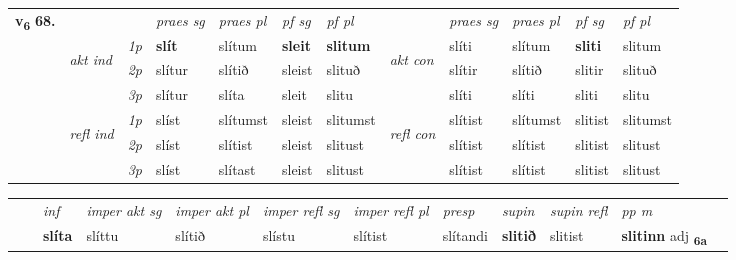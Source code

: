 \begin{tabular}{llllllllllll} \toprule
\multirow{4}{*}{{{\textbf{v{\textsubscript{6}}} \Large{\textbf{68.}}}}}  & &   &  \textit{praes sg}  & \textit{praes pl}  &\textit{ pf sg} & \textit{pf pl} &  &  \textit{praes sg}  & \textit{praes pl}  & \textit{pf sg} & \textit{pf pl } \\*
	\cmidrule{4-7} \cmidrule{9-12}
 & \multirow{3}{*}{\begin{turn}{90}\textit{akt ind}\end{turn}} & {\textit{1p}} & \textbf{slít} & slítum    & \textbf{sleit} & \textbf{slitum} & \multirow{3}{*}{\begin{turn}{90}\textit{akt con}\end{turn}} &slíti & slítum & \textbf{sliti} & slitum\\*
& &  {\textit{2p}} &  slítur  & slítið   & sleist & slituð & & slítir & slítið & slitir & slituð \\*
& &  {\textit{3p}} & slítur & slíta   & sleit & slitu & & slíti & slíti& sliti & slitu  \\*
\cmidrule{4-7} \cmidrule{9-12}
 &\multirow{3}{*}{\begin{turn}{90}\textit{refl ind}\end{turn}} & {\textit{1p}} & slíst & slítumst    & sleist & slitumst & \multirow{3}{*}{\begin{turn}{90}\textit{refl con}\end{turn}}  &slítist & slítumst & slitist & slitumst\\*
 &&  {\textit{2p}} &  slíst  & slítist   & sleist & slitust & &slítist & slítist & slitist & slitust \\*
& &  {\textit{3p}} & slíst & slítast   & sleist & slitust & & slítist & slítist& slitist & slitust  \\*
\cmidrule{4-7} \cmidrule{9-12}
\end{tabular}


\begin{tabular}{llllllllllll}
 & & \textit{inf} & \textit{imper akt sg} & \textit{imper akt pl} & \textit{imper refl sg} & \textit{imper refl pl} & \textit{presp} & \textit{supin} & \textit{supin refl} & \textit{pp m}     \\*
  & & \textbf{slíta} & slíttu  & slítið & slístu & slítist & slítandi &  \textbf{slitið} & slitist & \textbf{slitinn} adj \textbf{\textsubscript{6a}} \\*
\cmidrule{1-12}
\end{tabular}




